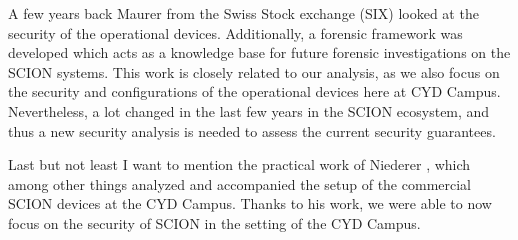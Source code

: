 A few years back Maurer \cite{Maurer2021} from the Swiss Stock exchange (SIX) looked at the security of the operational devices.
Additionally, a forensic framework was developed which acts as a knowledge base for future forensic investigations on the SCION systems.
This work is closely related to our analysis, as we also focus on the security and configurations of the operational devices here at CYD Campus.
Nevertheless, a lot changed in the last few years in the SCION ecosystem, and thus a new security analysis is needed to assess the current security guarantees.



Last but not least I want to mention the practical work of Niederer \cite{Niederer2022}, which among other things analyzed and accompanied the setup of the commercial SCION devices at the CYD Campus.
Thanks to his work, we were able to now focus on the security of SCION in the setting of the CYD Campus.

